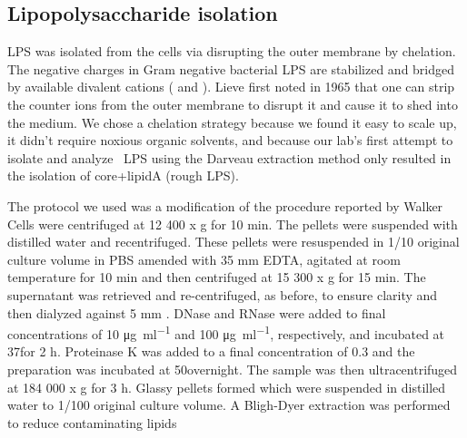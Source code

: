 	\subsection{Lipopolysaccharide isolation} %
	\label{sub:LPS_isolation}
  \ac{LPS} was isolated from the cells via disrupting the outer membrane by chelation.  The negative charges in Gram negative bacterial \ac{LPS} are stabilized and bridged by available
  divalent cations (\ie{}  and ). Lieve first noted in 1965 that
  one can strip the counter ions from the outer membrane to disrupt it and cause it to shed into the
  medium. We chose a chelation strategy because we found it easy to scale up, it didn't require
  noxious organic solvents, and because our lab's first attempt to isolate and analyze \caulobacter\
  \ac{LPS} using the Darveau extraction method only
  resulted in the isolation of core+lipidA (rough \ac{LPS}).

  The protocol we used was a modification of the procedure reported by Walker
  \etal\!\upcite{walker94} Cells were centrifuged at 12 400 x g for 10 min. The pellets were
  suspended with distilled water and recentrifuged. These pellets were resuspended in 1/10 original
  culture volume in \ac{PBS}\upcite{maniatis} amended with 35 \si{\milli\meter} \ac{EDTA}, agitated
  at room temperature for 10 min and then centrifuged at 15 300 x g for 15 min. The supernatant was
  retrieved and re-centrifuged, as before, to ensure clarity and then dialyzed against 5
  \si{\milli\meter} \ce{MgCl2}. DNase and RNase were added to final concentrations of 10
  \si{\micro\gram\per\milli\litre} and 100 \si{\micro\gram\per\milli\litre}\!, respectively, and
  incubated at 37\cel for 2 h. Proteinase K was added to a final concentration of 0.3 \mgperml and
  the preparation was incubated at 50\cel overnight. The sample was then ultracentrifuged at 184 000
  x g for 3 h. Glassy pellets formed which were suspended in distilled water to 1/100 original
  culture volume. A Bligh-Dyer extraction was performed to reduce contaminating
  lipids\upcite[.]{blighdyer}


